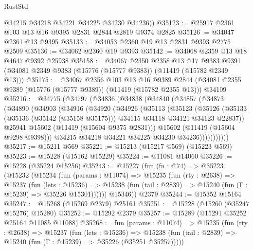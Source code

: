 \begin{lexlean}{RustStd}
\begin{coremodule}
        @34215
        @34218
        @34221
        @34225
        @34230
        @34236))
@35123 := @25917 @2361 @103 @13 @16 @9395 @2831 @2844 @2819 @9374 @2825
@35126 := @34047 @2361 @13 @9395
@35133 := @34053 @2360 @19 @13 @2831 @9393 @2775 @2509
@35136 := @34062 @2360 @19 @9393
@35142 := @34068 @2359 @13 @18 @4647 @9392 @25938
@35158 := @34067
    @2350
    @2358
    @13
    @17
    @9383
    @9391
    (@34081 @2349 @9383 (@15776 (@15777 @9383)) (@11419 (@15782 @2349 @13)))
@35175 := @34067
    @2356
    @103
    @13
    @16
    @9389
    @2844
    (@34081 @2355 @9389 (@15776 (@15777 @9389)) (@11419 (@15782 @2355 @13)))
    @34109
@35216 := @34775
    (@34797
      (@34836
        (@34838
          (@34840
            (@34857
              (@34873
                (@34890
                  (@34903
                    (@34916
                      (@34920
                        (@34926
                          (@35113
                            (@35123
                              (@35126
                                (@35133
                                  (@35136 (@35142 (@35158 @35175)))
                                  @34115
                                  @34118
                                  @34121
                                  @34123
                                  @22837))
                              @25941
                              @15602
                              (@11419 (@15604 @9375 @2831)))
                            @15602
                            (@11419 (@15604 @9298 @9398)))
                          @34215
                          @34218
                          @34221
                          @34225
                          @34230
                          @34236)))))))))))
@35217 := @15211 @569
@35221 := @15213 (@15217 @569) (@15223 @569)
@35223 := @15228 (@15162 @15229)
@35224 := @11081 @14060
@35226 := @15228 (@35224 @15256)
@35243 := @15227
    (fun (fn : @74) =>
    @35223
      (@15232
        (@15234
          (fun (params : @11074) =>
          @15235
            (fun (rty : @2638) =>
            @15237
              (fun (lets : @15236) =>
              @15238 (fun (tail : @2839) => @15240 (fun (Γ : @15239) => @35226 @15301))))))
        @15346))
    @2379
@35244 := @15352 @15164
@35247 := @15268 (@15269 @2379) @25161
@35251 := @15228 (@15260 (@35247 @15276) @15280)
@35252 := @15292 @2379
@35257 := @15289 (@15291 @35252 @25164 @11085 @11088)
@35268 := fun (params : @11074) =>
  @15235
    (fun (rty : @2638) =>
    @15237
      (fun (lets : @15236) =>
      @15238 (fun (tail : @2839) => @15240 (fun (Γ : @15239) => @35226 (@35251 @35257)))))

\end{coremodule}
\end{lexlean}
